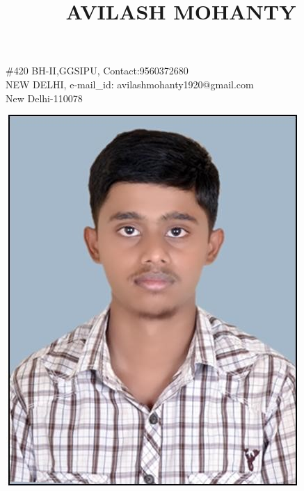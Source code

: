 \documentclass{article}
\begin{document}
\title{\begin{huge}AVILASH MOHANTY\end{huge}}
\maketitle

\begin{flushleft}
$\#$420 BH-II,GGSIPU, 
\hfill{Contact:9560372680}\\
NEW DELHI, 
\hfill{e-mail\_id: avilashmohanty1920@gmail.com}\\
New Delhi-110078

\end{flushleft}


\begin{flushright}
\includegraphics [scale=0.25]{picture.jpg}
\end{flushright}
\end{document}
